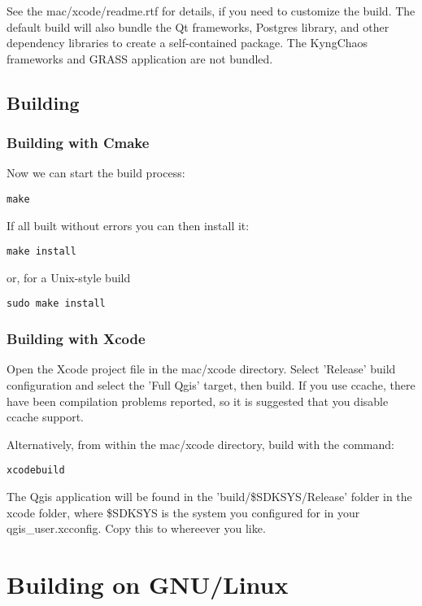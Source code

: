 See the mac/xcode/readme.rtf for details, if you need to customize the build.
The default build will also bundle the Qt frameworks, Postgres library, and
other dependency libraries to create a self-contained package. The KyngChaos
frameworks and GRASS application are not bundled.

\subsection{Building}
\subsubsection{Building with Cmake}
Now we can start the build process:

\begin{verbatim}
make 
\end{verbatim}

If all built without errors you can then install it:

\begin{verbatim}
make install 
\end{verbatim}

or, for a Unix-style build

\begin{verbatim}
sudo make install
\end{verbatim}

\subsubsection{Building with Xcode}
Open the Xcode project file in the mac/xcode directory. Select 'Release' build
configuration and select the 'Full Qgis' target, then build. If you use ccache,
there have been compilation problems reported, so it is suggested that you disable
ccache support.

Alternatively, from within the mac/xcode directory, build with the command:

\begin{verbatim}
xcodebuild
\end{verbatim}

The Qgis application will be found in the 'build/\$SDKSYS/Release' folder
in the xcode folder, where \$SDKSYS is the system you configured for in your
qgis\_user.xcconfig. Copy this to whereever you like.


\section{Building on GNU/Linux}
